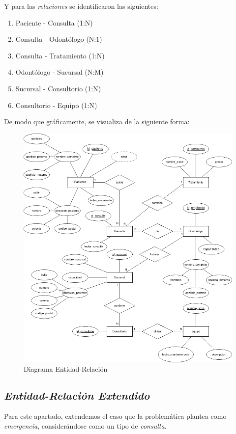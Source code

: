 \documentclass[a4paper,12pt]{article}
\begin{document}
\newpage

Y para las \emph{relaciones} se identificaron las siguientes:

\begin{enumerate}
	\item Paciente - Consulta (1:N) 
	\item Consulta - Odontólogo (N:1)
	\item Consulta - Tratamiento (1:N)
	\item Odontólogo - Sucursal (N:M)
	\item Sucursal - Consultorio (1:N)
	\item Consultorio - Equipo (1:N)
\end{enumerate}


De modo que gráficamente, se visualiza de la siguiente forma:\\

\begin{figure}[!h]
\centering
	\includegraphics[width=.85\textwidth]{ER}
	 \caption{Diagrama Entidad-Relación}
\end{figure}

\subsection{\textit{Entidad-Relación Extendido}}

Para este apartado, extendemos el caso que la problemática plantea como \emph{emergencia}, considerándose como un tipo de \textit{consulta}. \\
\end{document}
